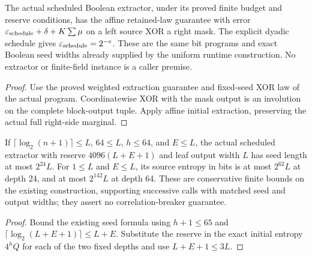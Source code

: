 \begin{theorem}
  \label{thm:lowerbounds-algebraic-scheduled-affine-initialization}
  \leanok
  The actual scheduled Boolean extractor, under its proved finite
  budget and reserve conditions, has the affine retained-law guarantee
  with error $\varepsilon_{\rm schedule}+\delta+K\sum\mu$ on a left
  source XOR a right mask. The explicit dyadic schedule gives
  $\varepsilon_{\rm schedule}=2^{-e}$. These are the same bit programs
  and exact Boolean seed widths already supplied by the uniform runtime
  construction. No extractor or finite-field instance is a caller premise.
\end{theorem}
\begin{proof}
  \leanok
  Use the proved weighted extraction guarantee and fixed-seed XOR law
  of the actual program. Coordinatewise XOR with the mask output is
  an involution on the complete block-output tuple. Apply affine initial
  extraction, preserving the actual full right-side marginal.
\end{proof}

\begin{theorem}
  \label{thm:lowerbounds-algebraic-bounded-depth}
  \leanok
  If $\lceil\log_2(n+1)\rceil\le L$, $64\le L$, $h\le64$, and $E\le L$,
  the actual scheduled extractor with reserve $4096(L+E+1)$ and leaf
  output width $L$ has seed length at most $2^{24}L$. For $1\le L$ and
  $E\le L$, its source entropy in bits is at most $2^{62}L$ at depth 24,
  and at most $2^{142}L$ at depth 64. These are conservative finite bounds
  on the existing construction, supporting successive calls with matched
  seed and output widths; they assert no correlation-breaker guarantee.
\end{theorem}
\begin{proof}
  \leanok
  Bound the existing seed formula using $h+1\le65$ and
  $\lceil\log_2(L+E+1)\rceil\le L+E$.
  Substitute the reserve in the exact initial entropy $4^hQ$ for each
  of the two fixed depths and use $L+E+1\le3L$.
\end{proof}

